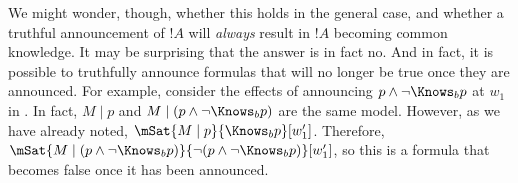 \documentclass[../../../include/open-logic-section]{subfiles}
\begin{document}
We might wonder, though, whether this holds in the general case, and whether a truthful
announcement of $!A$ will \emph{always} result in $!A$ becoming common knowledge. It may
be surprising that the answer is in fact no. And in fact, it is possible to truthfully announce formulas that will
no longer be true once they are announced. For example, consider the effects of announcing 
$p \land \lnot \Knows_b p$ at $w_1$ in . In fact, $M \mid p$ and
$M \mid (p \land \lnot \Knows_b p)$ are the same model. However, as we have already noted, 
$\mSat{M \mid p}{\Knows_b p}[w'_1]$. Therefore,
 $\mSat{M \mid (p \land \lnot \Knows_b p)}{\lnot (p \land \lnot \Knows_b p)}[w'_1]$, so this is a formula
 that becomes false once it has been announced. 
\end{document}
